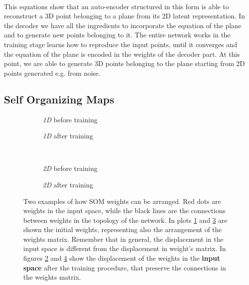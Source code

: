 \paragraph{}
This equations show that an auto-encoder structured in this form is able to reconstruct a 3D point belonging to a plane from its 2D latent representation. In the decoder we have all the ingredients to incorporate the equation of the plane and to generate new points belonging to it. \newline
The entire network works in the training stage learns how to reproduce the input points, until it converges and the equation of the plane is encoded in the weights of the decoder part. At this point, we are able to generate 3D points belonging to the plane starting from 2D points generated e.g. from noise. 

\subsection{Self Organizing Maps}
\begin{figure}[hb]
     \centering
     \begin{subfigure}{0.4\textwidth}
         \centering
        
         \caption{\textit{1D} before training}
         \label{subfig:som-one-before}
     \end{subfigure}
     \begin{subfigure}{0.4\textwidth}
         \centering
        
         \caption{\textit{1D} after training}
         \label{subfig:som-one-after}
     \end{subfigure}
     \\
     \begin{subfigure}{0.4\textwidth}
         \centering
         
         \caption{\textit{2D} before training}
         \label{subfig:som-two-before}
     \end{subfigure}
     \begin{subfigure}{0.4\textwidth}
         \centering
         
         \caption{\textit{2D} after training}
         \label{subfig:som-two-after}
     \end{subfigure}
     \caption{Two examples of how SOM weights can be arranged. Red dots are weights in the input space, while the black lines are the connections between weights in the topology of the network. In plots \ref{subfig:som-one-before} and \ref{subfig:som-two-before} are shown the initial weights, representing also the arrangement of the weights matrix. Remember that in general, the displacement in the input space is different from the displacement in weight's matrix. In figures \ref{subfig:som-one-after} and \ref{subfig:som-two-after} show the displacement of the weights in the \textbf{input space} after the training procedure, that preserve the connections in the weights matrix.}
     \label{fig:som_weights}
\end{figure}

